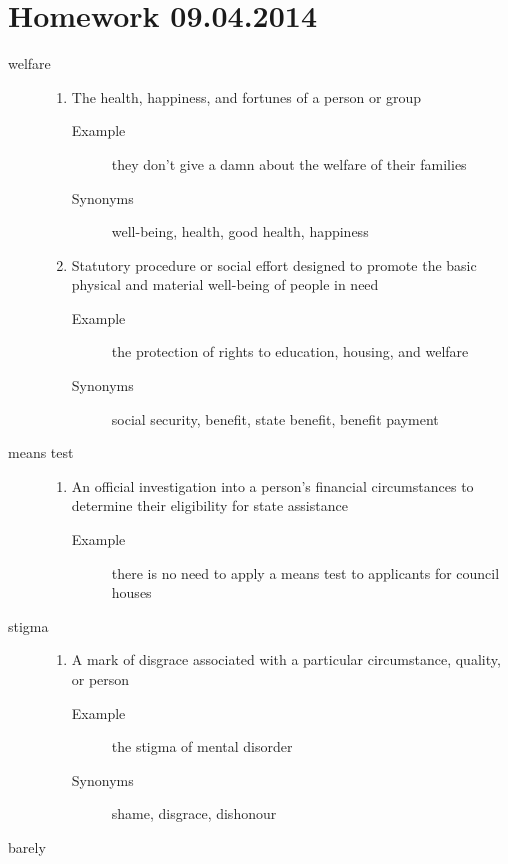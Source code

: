 \documentclass[12pt]{article}
\begin{document}
\section{Homework 09.04.2014}
\begin{description}
\item[welfare]
	\begin{enumerate}
	\item The health, happiness, and fortunes of a person or group
		\begin{description}
		\item[Example] they don’t give a damn about the welfare of their families
		\item[Synonyms] well-being, health, good health, happiness
		\end{description}
	\item Statutory procedure or social effort designed to promote the basic physical and material well-being of people in need
		\begin{description}
		\item[Example] the protection of rights to education, housing, and welfare
		\item[Synonyms] social security, benefit, state benefit, benefit payment
		\end{description}
	\end{enumerate}
\item[means test]
	\begin{enumerate}
	\item An official investigation into a person’s financial circumstances to determine their eligibility for state assistance
		\begin{description}
		\item[Example] there is no need to apply a means test to applicants for council houses
		\end{description}
	\end{enumerate}
\item[stigma]
	\begin{enumerate}
	\item A mark of disgrace associated with a particular circumstance, quality, or person
		\begin{description}
		\item[Example] the stigma of mental disorder
		\item[Synonyms] shame, disgrace, dishonour
		\end{description}
	\end{enumerate}
\item[barely]

\end{description}
\end{document}
